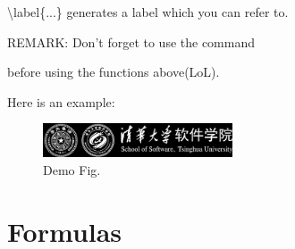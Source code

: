 \documentclass[a4paper,12pt]{article}
\begin{document}
    \textbackslash label\{...\} generates a label which you can refer to.

    REMARK: Don't forget to use the command
    

    before using the functions above(LoL).

    Here is an example:
    \begin{figure}[h]
    \centering
    \includegraphics[width=0.5\textwidth]{demo.png}
    \caption{Demo Fig.}
    \label{image-demo image}
    \end{figure}

\section{Formulas} 
\end{document}

